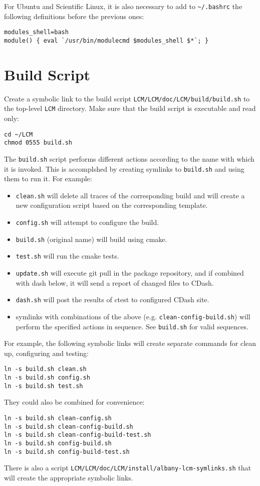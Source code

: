\documentclass{article}
\begin{document}
For Ubuntu and Scientific Linux, it is also necessary to add to \verb+~/.bashrc+
the following definitions before the previous ones:
\begin{verbatim}
modules_shell=bash
module() { eval `/usr/bin/modulecmd $modules_shell $*`; }
\end{verbatim}

\section{Build Script}
Create a symbolic link to the build script
\verb+LCM/LCM/doc/LCM/build/build.sh+ to the top-level \verb+LCM+
directory. Make sure that the build script is executable and
read only:
\begin{verbatim}
cd ~/LCM
chmod 0555 build.sh
\end{verbatim}

The \verb+build.sh+ script performs different actions according to the name with
which it is invoked. This is accomplshed by creating symlinks to \verb+build.sh+
and using them to run it. For example:
\begin{itemize}
\item \verb+clean.sh+ will delete all traces of the corresponding build and will
  create a new configuration script based on the corresponding template.

\item \verb+config.sh+ will attempt to configure the build.

\item \verb+build.sh+ (original name) will build using cmake.

\item \verb+test.sh+ will run the cmake tests.

\item \verb+update.sh+ will execute git pull in the package repository, and if
  combined with dash below, it will send a report of changed files to CDash.

\item \verb+dash.sh+ will post the results of ctest to configured CDash site.

\item symlinks with combinations of the above
  (e.g. \verb+clean-config-build.sh+) will perform the specified actions in
  sequence. See \verb+build.sh+ for valid sequences.
\end{itemize}
For example, the following symbolic links will create separate
commands for clean up, configuring and testing:
\begin{verbatim}
ln -s build.sh clean.sh
ln -s build.sh config.sh
ln -s build.sh test.sh
\end{verbatim}
They could also be combined for convenience:
\begin{verbatim}
ln -s build.sh clean-config.sh
ln -s build.sh clean-config-build.sh
ln -s build.sh clean-config-build-test.sh
ln -s build.sh config-build.sh
ln -s build.sh config-build-test.sh
\end{verbatim}
There is also a script
\verb+LCM/LCM/doc/LCM/install/albany-lcm-symlinks.sh+
that will create the appropriate symbolic links.
\end{document}
